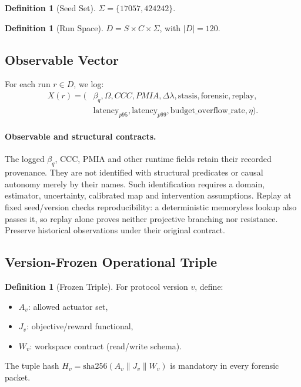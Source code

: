 \documentclass[11pt,a4paper]{article}
\theoremstyle{definition}
\newtheorem{definition}[theorem]{Definition}
\begin{document}
\begin{definition}[Seed Set]
$\Sigma = \{17057, 424242\}$.
\end{definition}

\begin{definition}[Run Space]
$D = S \times C \times \Sigma$, with $|D|=120$.
\end{definition}

\subsection{Observable Vector}
For each run $r\in D$, we log:
\[
\begin{aligned}
X(r)=\bigl(&\beta_q,\Omega,CCC,PMIA,\Delta\lambda,\text{stasis},\text{forensic},\text{replay},\\
&\text{latency}_{p95},\text{latency}_{p99},\text{budget\_overflow\_rate},\eta\bigr).
\end{aligned}
\]

\paragraph{Observable and structural contracts.}
The logged $\beta_q$, CCC, PMIA and other runtime fields retain their recorded provenance. They are not identified with structural predicates or causal autonomy merely by their names. Such identification requires a domain, estimator, uncertainty, calibrated map and intervention assumptions. Replay at fixed seed/version checks reproducibility: a deterministic memoryless lookup also passes it, so replay alone proves neither projective branching nor resistance. Preserve historical observations under their original contract.

\subsection{Version-Frozen Operational Triple}
\begin{definition}[Frozen Triple]
For protocol version $v$, define:
\begin{itemize}
\item $A_v$: allowed actuator set,
\item $J_v$: objective/reward functional,
\item $W_v$: workspace contract (read/write schema).
\end{itemize}
The tuple hash $H_v=\mathrm{sha256}(A_v\|J_v\|W_v)$ is mandatory in every forensic packet.
\end{definition}
\end{document}
